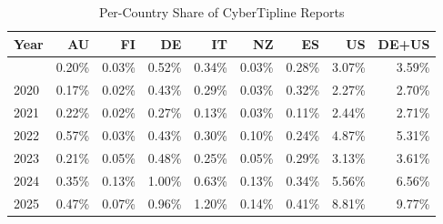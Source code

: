 \begin{table}[!t]
\caption*{
{\large Per-Country Share of CyberTipline Reports}
} 

\fontsize{12.0pt}{14.4pt}\selectfont

\begin{tabular*}{\linewidth}{@{\extracolsep{\fill}}lrrrrrrrr}
\toprule
Year & AU & FI & DE & IT & NZ & ES & US & DE+US \\ 
\midrule\addlinespace[2.5pt]
2019 & 0.20\% & 0.03\% & 0.52\% & 0.34\% & 0.03\% & 0.28\% & 3.07\% & 3.59\% \\
2020 & 0.17\% & 0.02\% & 0.43\% & 0.29\% & 0.03\% & 0.32\% & 2.27\% & 2.70\% \\
2021 & 0.22\% & 0.02\% & 0.27\% & 0.13\% & 0.03\% & 0.11\% & 2.44\% & 2.71\% \\
2022 & 0.57\% & 0.03\% & 0.43\% & 0.30\% & 0.10\% & 0.24\% & 4.87\% & 5.31\% \\
2023 & 0.21\% & 0.05\% & 0.48\% & 0.25\% & 0.05\% & 0.29\% & 3.13\% & 3.61\% \\
2024 & 0.35\% & 0.13\% & 1.00\% & 0.63\% & 0.13\% & 0.34\% & 5.56\% & 6.56\% \\
2025 & 0.47\% & 0.07\% & 0.96\% & 1.20\% & 0.14\% & 0.41\% & 8.81\% & 9.77\% \\
\bottomrule
\end{tabular*}

\end{table}
